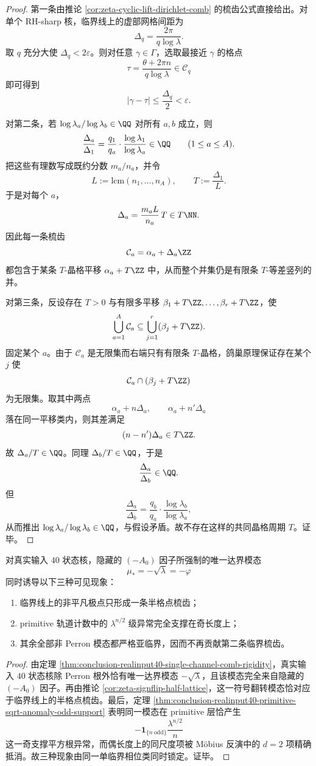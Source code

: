 \begin{proof}
第一条由推论 \ref{cor:zeta-cyclic-lift-dirichlet-comb} 的梳齿公式直接给出。对单个 RH-sharp 核，临界线上的虚部网格间距为
\[
\Delta_q=\frac{2\pi}{q\log\lambda}.
\]
取 \(q\) 充分大使 \(\Delta_q<2\varepsilon\)。则对任意 \(\gamma\in\Gamma\)，选取最接近 \(\gamma\) 的格点
\[
\tau=\frac{\theta+2\pi n}{q\log\lambda}\in\mathcal C_q
\]
即可得到
\[
|\gamma-\tau|\le \frac{\Delta_q}{2}<\varepsilon.
\]

对第二条，若 \(\log\lambda_a/\log\lambda_b\in\QQ\) 对所有 \(a,b\) 成立，则
\[
\frac{\Delta_a}{\Delta_1}
=
\frac{q_1}{q_a}\cdot\frac{\log\lambda_1}{\log\lambda_a}
\in\QQ
\qquad (1\le a\le A).
\]
把这些有理数写成既约分数 \(m_a/n_a\)，并令
\[
L:=\mathrm{lcm}(n_1,\dots,n_A),
\qquad
T:=\frac{\Delta_1}{L}.
\]
于是对每个 \(a\)，
\[
\Delta_a=\frac{m_aL}{n_a}\,T\in T\NN.
\]
因此每一条梳齿
\[
\mathcal C_a=\alpha_a+\Delta_a\ZZ
\]
都包含于某条 \(T\)-晶格平移 \(\alpha_a+T\ZZ\) 中，从而整个并集仍是有限条 \(T\)-等差竖列的并。

对第三条，反设存在 \(T>0\) 与有限多平移 \(\beta_1+T\ZZ,\dots,\beta_r+T\ZZ\)，使
\[
\bigcup_{a=1}^{A}\mathcal C_a\subseteq \bigcup_{j=1}^{r}(\beta_j+T\ZZ).
\]
固定某个 \(a\)。由于 \(\mathcal C_a\) 是无限集而右端只有有限条 \(T\)-晶格，鸽巢原理保证存在某个 \(j\) 使
\[
\mathcal C_a\cap(\beta_j+T\ZZ)
\]
为无限集。取其中两点
\[
\alpha_a+n\Delta_a,\qquad \alpha_a+n'\Delta_a
\]
落在同一平移类内，则其差满足
\[
(n-n')\Delta_a\in T\ZZ.
\]
故 \(\Delta_a/T\in\QQ\)。同理 \(\Delta_b/T\in\QQ\)，于是
\[
\frac{\Delta_a}{\Delta_b}\in\QQ.
\]
但
\[
\frac{\Delta_a}{\Delta_b}
=
\frac{q_b}{q_a}\cdot\frac{\log\lambda_b}{\log\lambda_a},
\]
从而推出 \(\log\lambda_a/\log\lambda_b\in\QQ\)，与假设矛盾。故不存在这样的共同晶格周期 \(T\)。证毕。
\end{proof}

\begin{corollary}[单临界相位类的单梳齿与奇支撑平方根异常]\label{cor:conclusion-realinput40-single-comb-odd-support-chain}
对真实输入 \(40\) 状态核，隐藏的 \((-A_0)\) 因子所强制的唯一达界模态
\[
\mu_\ast=-\sqrt{\lambda}=-\varphi
\]
同时诱导以下三种可见现象：
\begin{enumerate}
  \item 临界线上的非平凡极点只形成一条半格点梳齿；
  \item primitive 轨道计数中的 \(\lambda^{n/2}\) 级异常完全支撑在奇长度上；
  \item 其余全部非 Perron 模态都严格亚临界，因而不再贡献第二条临界梳齿。
\end{enumerate}
\end{corollary}
\begin{proof}
由定理 \ref{thm:conclusion-realinput40-single-channel-comb-rigidity}，真实输入 \(40\) 状态核除 Perron 根外恰有唯一达界模态 \(-\sqrt{\lambda}\)，且该模态完全来自隐藏的 \((-A_0)\) 因子。再由推论 \ref{cor:zeta-signflip-half-lattice}，这一符号翻转模态恰对应于临界线上的半格点梳齿。最后，定理 \ref{thm:conclusion-realinput40-primitive-sqrt-anomaly-odd-support} 表明同一模态在 primitive 层恰产生
\[
-\mathbf 1_{\{n\ \mathrm{odd}\}}\frac{\lambda^{n/2}}{n}
\]
这一奇支撑平方根异常，而偶长度上的同尺度项被 Möbius 反演中的 \(d=2\) 项精确抵消。故三种现象由同一单临界相位类同时锁定。证毕。
\end{proof}

